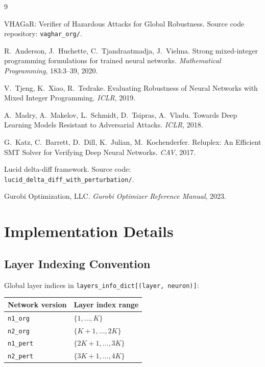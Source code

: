 \documentclass[11pt,a4paper]{article}
\theoremstyle{definition}
\theoremstyle{plain}
\begin{document}
\begin{thebibliography}{9}

VHAGaR: Verifier of Hazardous Attacks for Global Robustness. Source code repository: \texttt{vaghar\_org/}.

R.\ Anderson, J.\ Huchette, C.\ Tjandraatmadja, J.\ Vielma.
Strong mixed-integer programming formulations for trained neural networks.
\emph{Mathematical Programming}, 183:3--39, 2020.

V.\ Tjeng, K.\ Xiao, R.\ Tedrake.
Evaluating Robustness of Neural Networks with Mixed Integer Programming.
\emph{ICLR}, 2019.

A.\ Madry, A.\ Makelov, L.\ Schmidt, D.\ Tsipras, A.\ Vladu.
Towards Deep Learning Models Resistant to Adversarial Attacks.
\emph{ICLR}, 2018.

G.\ Katz, C.\ Barrett, D.\ Dill, K.\ Julian, M.\ Kochenderfer.
Reluplex: An Efficient SMT Solver for Verifying Deep Neural Networks.
\emph{CAV}, 2017.

Lucid delta-diff framework. Source code: \texttt{lucid\_delta\_diff\_with\_perturbation/}.

Gurobi Optimization, LLC.
\emph{Gurobi Optimizer Reference Manual}, 2023.

\end{thebibliography}

\appendix
\section{Implementation Details}

\subsection{Layer Indexing Convention}

Global layer indices in \texttt{layers\_info\_dict[(layer, neuron)]}:

\begin{center}
\begin{tabular}{ll}
\toprule
\textbf{Network version} & \textbf{Layer index range} \\
\midrule
\texttt{n1\_org}  & $\{1, \ldots, K\}$ \\
\texttt{n2\_org}  & $\{K+1, \ldots, 2K\}$ \\
\texttt{n1\_pert} & $\{2K+1, \ldots, 3K\}$ \\
\texttt{n2\_pert} & $\{3K+1, \ldots, 4K\}$ \\
\bottomrule
\end{tabular}
\end{center}
\end{document}

